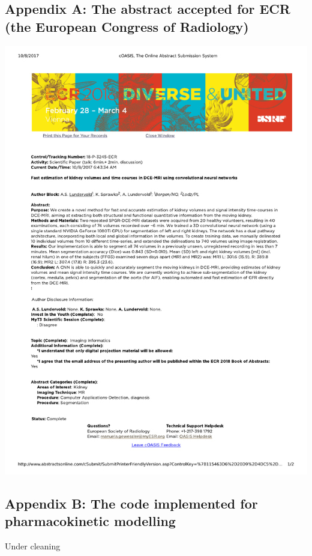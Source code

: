\subsection*{\textbf{Appendix A:} The abstract accepted for ECR (the European Congress of Radiology)}

\begin{center}

\includegraphics[trim={0 3.5cm 0 1cm},clip,height = 19 cm]{appendices/abstract}

\end{center}

\newpage
\subsection*{\textbf{Appendix B:} The code implemented for pharmacokinetic modelling}

Under cleaning